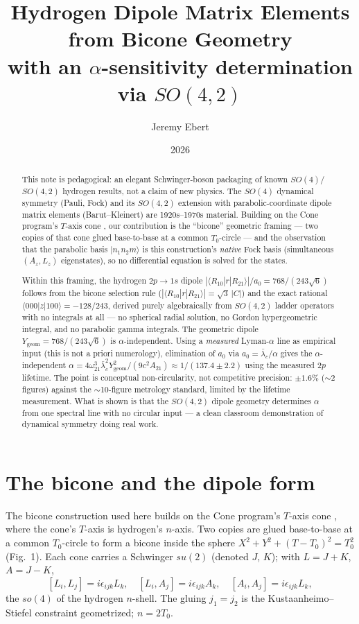 \documentclass[11pt]{amsart}
\title[Bicone dipole matrix elements]{Hydrogen Dipole Matrix Elements\\
from Bicone Geometry\\
\large with an $\alpha$-sensitivity determination via $SO(4,2)$}
\author{Jeremy Ebert}
\date{2026}
\theoremstyle{remark}
\begin{document}
\begin{abstract}
This note is pedagogical: an elegant Schwinger-boson packaging of
known $SO(4)$/$SO(4,2)$ hydrogen results, not a claim of new physics.
The $SO(4)$ dynamical symmetry (Pauli, Fock) and its $SO(4,2)$
extension with parabolic-coordinate dipole matrix elements
(Barut--Kleinert) are 1920s--1970s material.  Building on the Cone
program's $T$-axis cone \cite{cone-roadmap,cone-abc}, our contribution
is the ``bicone'' geometric framing --- two copies of that cone glued
base-to-base at a common $T_0$-circle --- and the observation that the
parabolic basis $|n_1n_2m\rangle$ is this construction's
\emph{native} Fock basis (simultaneous $(A_z,L_z)$ eigenstates), so no
differential equation is solved for the states.

Within this framing, the hydrogen $2p\to1s$ dipole
$|\langle R_{10}|r|R_{21}\rangle|/a_0=768/(243\sqrt6)$ follows from
the bicone selection rule ($|\langle R_{10}|r|R_{21}\rangle|
=\sqrt3\,|C|$) and the exact rational
$\langle000|z|100\rangle=-128/243$, derived purely algebraically from
$SO(4,2)$ ladder operators with no integrals at all --- no spherical
radial solution, no Gordon hypergeometric integral, and no parabolic
gamma integrals.  The geometric dipole
$Y_{\mathrm{geom}}=768/(243\sqrt6)$ is $\alpha$-independent.  Using a
\emph{measured} Lyman-$\alpha$ line as empirical input (this is not
a priori numerology), elimination of $a_0$ via
$a_0=\bar\lambda_c/\alpha$ gives the $\alpha$-independent
$\alpha=4\omega_{21}^3\bar\lambda_c^2Y_{\mathrm{geom}}^2/(9c^2A_{21})
\approx1/(137.4\pm2.2)$ using the measured $2p$ lifetime.  The point
is conceptual non-circularity, not competitive precision: $\pm1.6\%$
($\sim$2 figures) against the $\sim$10-figure metrology standard,
limited by the lifetime measurement.  What is shown is that the
$SO(4,2)$ dipole geometry determines $\alpha$ from one spectral line
with no circular input --- a clean classroom demonstration of
dynamical symmetry doing real work.
\end{abstract}

\maketitle

\section{The bicone and the dipole form}

The bicone construction used here builds on the Cone program's
$T$-axis cone \cite{cone-roadmap,cone-abc}, where the cone's $T$-axis
is hydrogen's $n$-axis.  Two copies are glued base-to-base
at a common $T_0$-circle to form a bicone
inside the sphere $X^2+Y^2+(T-T_0)^2=T_0^2$ (Fig.~1).  Each cone carries
a Schwinger $su(2)$ (denoted $J$, $K$); with $L=J+K$, $A=J-K$,
\[
[L_i,L_j]=i\epsilon_{ijk}L_k,\quad
[L_i,A_j]=i\epsilon_{ijk}A_k,\quad
[A_i,A_j]=i\epsilon_{ijk}L_k,
\]
the $so(4)$ of the hydrogen $n$-shell.  The gluing $j_1=j_2$ is the
Kustaanheimo--Stiefel constraint geometrized; $n=2T_0$.
\end{document}
